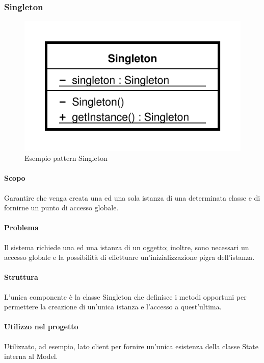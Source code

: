 \documentclass[../PianoDiQualifica.tex]{subfiles}
\begin{document}
			\subsubsection{Singleton}
				\begin{figure}[H] \label{fig:Singleton}
					\centering
					\includegraphics[scale=0.4]{Immagini/SingletonEx.png}
					\caption{Esempio pattern Singleton}
				\end{figure}
				\paragraph{Scopo\\}
					Garantire che venga creata una ed una sola istanza di una determinata classe e di
					fornirne un punto di accesso globale.
				\paragraph{Problema\\}
					Il sistema richiede una ed una istanza di un oggetto; inoltre, sono necessari un
					accesso globale e la possibilità di effettuare un'inizializzazione pigra
					dell'istanza.
				\paragraph{Struttura\\}
					L'unica componente è la classe Singleton che definisce i metodi opportuni per
					permettere la creazione di un'unica istanza e l'accesso a quest'ultima.
				\paragraph{Utilizzo nel progetto\\}
					Utilizzato, ad esempio, lato client per fornire un'unica esistenza della
					classe State interna al Model.
\end{document}
